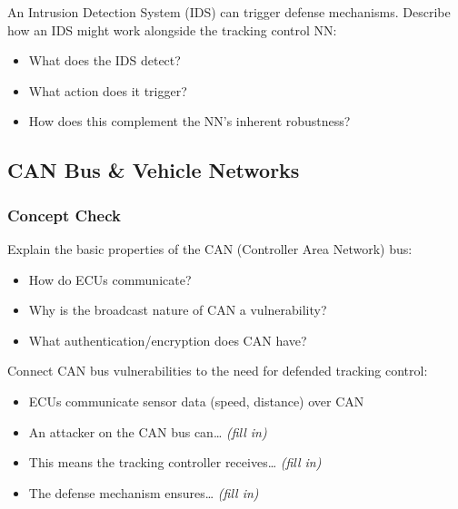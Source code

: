 \begin{answerbox}\end{answerbox}

An Intrusion Detection System (IDS) can trigger defense mechanisms. Describe how an IDS might work alongside the tracking control NN:
\begin{itemize}[nosep]
  \item What does the IDS detect?
  \item What action does it trigger?
  \item How does this complement the NN's inherent robustness?
\end{itemize}

\begin{answerbox}\end{answerbox}

\subsection{CAN Bus \& Vehicle Networks}

\subsubsection*{Concept Check}

Explain the basic properties of the CAN (Controller Area Network) bus:
\begin{itemize}[nosep]
  \item How do ECUs communicate?
  \item Why is the broadcast nature of CAN a vulnerability?
  \item What authentication/encryption does CAN have?
\end{itemize}

\begin{answerbox}\end{answerbox}

Connect CAN bus vulnerabilities to the need for defended tracking control:
\begin{itemize}[nosep]
  \item ECUs communicate sensor data (speed, distance) over CAN
  \item An attacker on the CAN bus can\ldots{} \emph{(fill in)}
  \item This means the tracking controller receives\ldots{} \emph{(fill in)}
  \item The defense mechanism ensures\ldots{} \emph{(fill in)}
\end{itemize}

